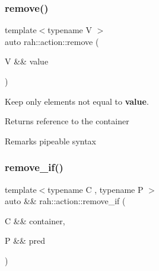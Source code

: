 \subsubsection{\texorpdfstring{remove()}{remove()}\hspace{0.1cm}{\footnotesize\ttfamily [2/2]}}
{\footnotesize\ttfamily template$<$typename V $>$ \\
auto rah\+::action\+::remove (\begin{DoxyParamCaption}\item[{V \&\&}]{value }\end{DoxyParamCaption})}



Keep only elements not equal to {\bfseries{value}}. 

\begin{DoxyReturn}{Returns}
reference to the container 
\end{DoxyReturn}
\begin{DoxyRemark}{Remarks}
pipeable syntax
\end{DoxyRemark}

\begin{DoxyCodeInclude}{0}
\end{DoxyCodeInclude}
\mbox{\label{namespacerah_1_1action_ab774cddf0da3ae6a4b505d8a2e05b0c7}} 
\subsubsection{\texorpdfstring{remove\_if()}{remove\_if()}\hspace{0.1cm}{\footnotesize\ttfamily [1/2]}}
{\footnotesize\ttfamily template$<$typename C , typename P $>$ \\
auto \&\& rah\+::action\+::remove\+\_\+if (\begin{DoxyParamCaption}\item[{C \&\&}]{container,  }\item[{P \&\&}]{pred }\end{DoxyParamCaption})}



